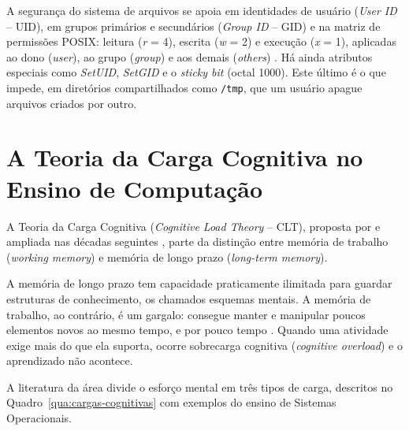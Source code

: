 A segurança do sistema de arquivos se apoia em identidades de usuário (\textit{User ID} -- UID), em grupos primários e secundários (\textit{Group ID} -- GID) e na matriz de permissões POSIX: leitura (\textit{r} = 4), escrita (\textit{w} = 2) e execução (\textit{x} = 1), aplicadas ao dono (\textit{user}), ao grupo (\textit{group}) e aos demais (\textit{others}) \cite{nemeth2017unix}. Há ainda atributos especiais como \textit{SetUID}, \textit{SetGID} e o \textit{sticky bit} (octal 1000). Este último é o que impede, em diretórios compartilhados como \texttt{/tmp}, que um usuário apague arquivos criados por outro.

\section{A Teoria da Carga Cognitiva no Ensino de Computação}
\label{sec:carga-cognitiva}

A Teoria da Carga Cognitiva (\textit{Cognitive Load Theory} -- CLT), proposta por  e ampliada nas décadas seguintes \cite{sweller2011cognitive, paas2003cognitive}, parte da distinção entre memória de trabalho (\textit{working memory}) e memória de longo prazo (\textit{long-term memory}).

A memória de longo prazo tem capacidade praticamente ilimitada para guardar estruturas de conhecimento, os chamados esquemas mentais. A memória de trabalho, ao contrário, é um gargalo: consegue manter e manipular poucos elementos novos ao mesmo tempo, e por pouco tempo \cite{sweller1988cognitive}. Quando uma atividade exige mais do que ela suporta, ocorre sobrecarga cognitiva (\textit{cognitive overload}) e o aprendizado não acontece.

A literatura da área \cite{paas2003cognitive, sweller2011cognitive} divide o esforço mental em três tipos de carga, descritos no Quadro~\ref{qua:cargas-cognitivas} com exemplos do ensino de Sistemas Operacionais.

